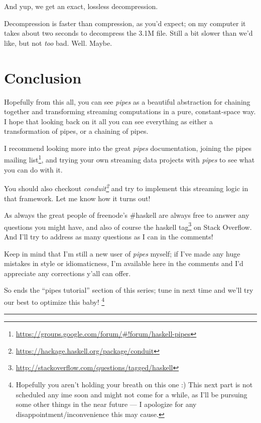 \documentclass[]{article}
\renewcommand{\href}[2]{#2\footnote{\url{#1}}}
\begin{document}
And yup, we get an exact, lossless decompression.

Decompression is faster than compression, as you'd expect; on my computer it
takes about two seconds to decompress the 3.1M file. Still a bit slower than
we'd like, but not \emph{too} bad. Well. Maybe.

\hypertarget{conclusion}{%
\section{Conclusion}\label{conclusion}}

Hopefully from this all, you can see \emph{pipes} as a beautiful abstraction for
chaining together and transforming streaming computations in a pure,
constant-space way. I hope that looking back on it all you can see everything as
either a transformation of pipes, or a chaining of pipes.

I recommend looking more into the great \emph{pipes} documentation, joining the
\href{https://groups.google.com/forum/\#!forum/haskell-pipes}{pipes mailing
list}, and trying your own streaming data projects with \emph{pipes} to see what
you can do with it.

You should also checkout
\emph{\href{https://hackage.haskell.org/package/conduit}{conduit}} and try to
implement this streaming logic in that framework. Let me know how it turns out!

As always the great people of freenode's \#haskell are always free to answer any
questions you might have, and also of course the
\href{http://stackoverflow.com/questions/tagged/haskell}{haskell tag} on Stack
Overflow. And I'll try to address as many questions as I can in the comments!

Keep in mind that I'm still a new user of \emph{pipes} myself; if I've made any
huge mistakes in style or idiomaticness, I'm available here in the comments and
I'd appreciate any corrections y'all can offer.

So ends the ``pipes tutorial'' section of this series; tune in next time and
we'll try our best to optimize this baby! \footnote{Hopefully you aren't holding
  your breath on this one :) This next part is not scheduled any ime soon and
  might not come for a while, as I'll be pursuing some other things in the near
  future --- I apologize for any disappointment/inconvenience this may cause.}

\begin{center}\rule{0.5\linewidth}{\linethickness}\end{center}
\end{document}

